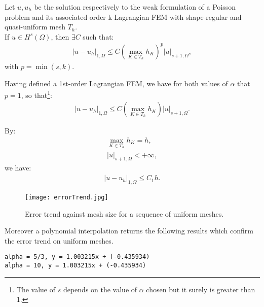 \begin{theorem}
	Let $u, u_h$ be the solution respectively to the weak formulation of a Poisson problem and its associated order k Lagrangian FEM with shape-regular and quasi-uniform mesh $T_h$. \\ 
	If $u \in H^s(\Omega)$, then $\exists C$ such that:
	\begin{gather}
		|u - u_h|_{1, \Omega} \le C (\max_{K \in T_h} h_K)^{p}|u|_{s+1, \Omega},
	\end{gather}
	with $p = \min(s, k)$.
\end{theorem}

Having defined a 1st-order Lagrangian FEM, we have for both values of $\alpha$ that $p = 1$, so that\footnote{The value of $s$ depends on the value of $\alpha$ chosen but it surely is greater than 1.}:
\begin{gather}
	|u - u_h|_{1, \Omega} \le C (\max_{K \in T_h} h_K)|u|_{s+1, \Omega}.
\end{gather}

By:
\begin{gather}
	\max_{K \in T_h} h_K = h, \\
	|u|_{s+1, \Omega} < +\infty,
\end{gather}
we have:
\begin{gather}
	|u - u_h|_{1, \Omega} \le C_1 h.
\end{gather}

\begin{figure}[!ht]
	\centering
	\texttt{[image: errorTrend.jpg]}
	\caption{Error trend against mesh size for a sequence of uniform meshes.}
\end{figure}

\noindent Moreover a polynomial interpolation returns the following results which confirm the error trend on uniform meshes.
\begin{verbatim}
alpha = 5/3, y = 1.003215x + (-0.435934)
alpha = 10, y = 1.003215x + (-0.435934)
\end{verbatim}